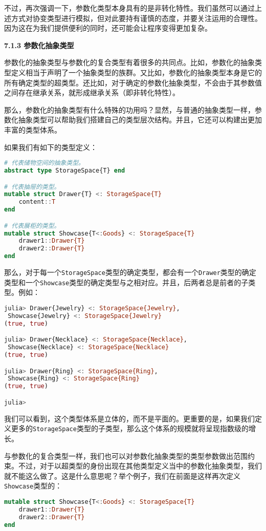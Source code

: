 不过，再次强调一下，参数化类型本身具有的是非转化特性。我们虽然可以通过上述方式对协变类型进行模拟，但对此要持有谨慎的态度，并要关注运用的合理性。因为这在为我们提供便利的同时，还可能会让程序变得更加复杂。

\textbf{7.1.3 参数化抽象类型}

参数化的抽象类型与参数化的复合类型有着很多的共同点。比如，参数化的抽象类型定义相当于声明了一个抽象类型的族群。又比如，参数化的抽象类型本身是它的所有确定类型的超类型。还比如，对于确定的参数化抽象类型，不会由于其参数值之间存在继承关系，就形成继承关系（即非转化特性）。

那么，参数化的抽象类型有什么特殊的功用吗？显然，与普通的抽象类型一样，参数化抽象类型可以帮助我们搭建自己的类型层次结构。并且，它还可以构建出更加丰富的类型体系。

如果我们有如下的类型定义：
\begin{lstlisting}[language=julia]
# 代表储物空间的抽象类型。
abstract type StorageSpace{T} end

# 代表抽屉的类型。
mutable struct Drawer{T} <: StorageSpace{T}
    content::T
end

# 代表展柜的类型。
mutable struct Showcase{T<:Goods} <: StorageSpace{T}
    drawer1::Drawer{T}
    drawer2::Drawer{T}
end
\end{lstlisting}

那么，对于每一个\verb|StorageSpace|类型的确定类型，都会有一个\verb|Drawer|类型的确定类型和一个\verb|Showcase|类型的确定类型与之相对应。并且，后两者总是前者的子类型。例如：
\begin{lstlisting}[language=julia]
julia> Drawer{Jewelry} <: StorageSpace{Jewelry},
 Showcase{Jewelry} <: StorageSpace{Jewelry}
(true, true)

julia> Drawer{Necklace} <: StorageSpace{Necklace},
 Showcase{Necklace} <: StorageSpace{Necklace}
(true, true)

julia> Drawer{Ring} <: StorageSpace{Ring},
 Showcase{Ring} <: StorageSpace{Ring}
(true, true)

julia> 
\end{lstlisting}

我们可以看到，这个类型体系是立体的，而不是平面的。更重要的是，如果我们定义更多的\verb|StorageSpace|类型的子类型，那么这个体系的规模就将呈现指数级的增长。

与参数化的复合类型一样，我们也可以对参数化抽象类型的类型参数做出范围约束。不过，对于以超类型的身份出现在其他类型定义当中的参数化抽象类型，我们就不能这么做了。这是什么意思呢？举个例子，我们在前面是这样再次定义\verb|Showcase|类型的：
\begin{lstlisting}[language=julia]
mutable struct Showcase{T<:Goods} <: StorageSpace{T}
    drawer1::Drawer{T}
    drawer2::Drawer{T}
end
\end{lstlisting}

